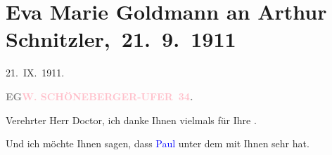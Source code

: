 

\renewcommand{\erwaehntePersonen}{Personen: Paul Goldmann, Dolly Landsberger, Louise Schnitzler, Gertrud Wertheim, Wolf Waldemar Wertheim, Gisbert von Wolff-Metternich}
\renewcommand{\erwaehnteInstitutionen}{Institutionen: Vossische Zeitung}
\renewcommand{\erwaehnteOrte}{Orte: Berlin, Bozen, Schöneberger Ufer, Wien}
\renewcommand{\erwaehnteWerke}{Werke: Der Prozeß gegen den Grafen Wolff-Metternich. Eine Erklärung der Frau Wertheim, Neues Wiener Journal, [Leserbrief von Gertrud Wertheim mit Klage über Paul Goldmann]}
\section[ Eva Marie Goldmann an Arthur Schnitzler, 21. 9. 1911]{Eva Marie Goldmann an Arthur Schnitzler, 21. 9. 1911}
\nopagebreak{}
\rehead{ }\normalsize\beginnumbering{}
\toendnotes[C]{\smallbreak\pagebreak[2]}
\toendnotes[C]{\smallbreak}
\pstart
           \raggedleft{}{\pb}21. IX. 1911.\pend
           
\pstart
           \textcolor{gray}{\textbf{EG}}\hfill \textcolor{gray}{\textbf{\textcolor{pink}{W. SCHÖNEBERGER-UFER 34}{}\ledrightnote{\textcolor{pink}{Schöneberger Ufer}}.}}\pend
           
\pstart{}Verehrter Herr Doctor, \pend
\pstart
           ich danke Ihnen vielmals für Ihre \label{K_L03540-1v}\label{K_L03540-1h}.\pend
           
\pstart
           Und ich möchte Ihnen sagen, dass \textcolor{blue}{Paul}{}\ledrightnote{\textcolor{blue}{Paul Goldmann}} unter
               dem \label{K_L03540-2v}\label{K_L03540-2h} mit Ihnen sehr \label{K_L03540-3v}\label{K_L03540-3h} hat.\pend
           
